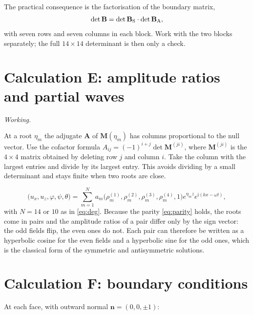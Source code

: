 \documentclass[11pt,a4paper]{article}
\newif\ifshowworked \showworkedtrue
\newenvironment{worked}{\ifshowworked\par\smallskip\noindent\textit{Working.}\par\else\setbox0\vbox\bgroup\fi}{\ifshowworked\par\smallskip\else\egroup\fi}
\newcommand{\ii}{\mathrm{i}}
\begin{document}
The practical consequence is the factorisation of the boundary matrix,
\begin{equation}\label{eq:factor}
\det\mathbf B=\det\mathbf B_{\rm S}\cdot\det\mathbf B_{\rm A},
\end{equation}
with seven rows and seven columns in each block. Work with the two blocks separately; the full $14\times14$
determinant is then only a check.

\section{Calculation E: amplitude ratios and partial waves}\label{sec:E}

\begin{worked}
At a root $\eta_m$ the adjugate $\mathbf A$ of $\mathbf M(\eta_m)$ has columns proportional to the null
vector. Use the cofactor formula $A_{ij}=(-1)^{i+j}\det\mathbf M^{(ji)}$, where $\mathbf M^{(ji)}$ is the
$4\times4$ matrix obtained by deleting row $j$ and column $i$. Take the column with the largest entries and
divide by its largest entry. This avoids dividing by a small determinant and stays finite when two roots are
close.
\end{worked}

\noindent
\begin{equation}\label{eq:general}
\bigl(u_x,u_z,\varphi,\psi,\theta\bigr)=\sum_{m=1}^{N}a_m
\bigl(\rho^{(1)}_m,\rho^{(2)}_m,\rho^{(3)}_m,\rho^{(4)}_m,1\bigr)e^{\eta_mz}e^{\ii(kx-\omega t)},
\end{equation}
with $N=14$ or $10$ as in \eqref{eq:deg}. Because the parity \eqref{eq:parity} holds, the roots come in pairs
and the amplitude ratios of a pair differ only by the sign vector: the odd fields flip, the even ones do not.
Each pair can therefore be written as a hyperbolic cosine for the even fields and a hyperbolic sine for the
odd ones, which is the classical form of the symmetric and antisymmetric solutions.

\section{Calculation F: boundary conditions}\label{sec:F}

At each face, with outward normal $\mathbf n=(0,0,\pm1)$:
\end{document}
